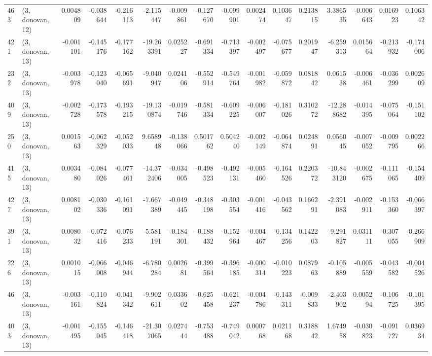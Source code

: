\begin{tabular}{llrrrrrrrrrrrrrr}
463 &  (3, donovan, 12) &   0.004809 & -0.038644 & -0.216113 &   -2.115447 & -0.009861 &  -0.127670 & -0.099901 &  0.002474 &  0.103647 &  0.213815 &     3.386535 & -0.006643 &  0.016923 &  0.106342 \\
421 &  (3, donovan, 13) &  -0.001101 & -0.145176 & -0.177162 &  -19.263391 &  0.025227 &  -0.691334 & -0.713397 & -0.002497 & -0.075677 &  0.201947 &    -6.259313 &  0.015664 & -0.213932 & -0.174006 \\
232 &  (3, donovan, 13) &  -0.003978 & -0.123040 & -0.065691 &   -9.040947 &  0.024106 &  -0.552914 & -0.549764 & -0.001982 & -0.059872 &  0.081842 &     0.061538 & -0.006461 & -0.036299 &  0.002609 \\
409 &  (3, donovan, 13) &  -0.002728 & -0.173578 & -0.193215 &  -19.130874 & -0.019746 &  -0.581334 & -0.609225 & -0.006007 & -0.181026 &  0.310272 &   -12.288682 & -0.014395 & -0.075064 & -0.151102 \\
250 &  (3, donovan, 13) &   0.001563 & -0.062329 & -0.052033 &    9.658948 & -0.138066 &   0.501762 &  0.504240 & -0.002149 & -0.064874 &  0.024891 &     0.056045 & -0.007052 & -0.009795 &  0.002266 \\
415 &  (3, donovan, 13) &   0.003480 & -0.084026 & -0.077461 &  -14.372406 & -0.034005 &  -0.498523 & -0.492131 & -0.005460 & -0.164526 &  0.220372 &   -10.843120 & -0.002675 & -0.111065 & -0.154409 \\
427 &  (3, donovan, 13) &   0.008102 & -0.030336 & -0.161091 &   -7.667389 & -0.049445 &  -0.348198 & -0.303554 & -0.001416 & -0.043562 &  0.166291 &    -2.391083 & -0.002911 & -0.153360 & -0.066397 \\
391 &  (3, donovan, 13) &   0.008032 & -0.072416 & -0.076233 &   -5.581191 & -0.184301 &  -0.188432 & -0.152964 & -0.004467 & -0.134256 &  0.142203 &    -9.291827 &  0.031111 & -0.307055 & -0.266909 \\
226 &  (3, donovan, 13) &   0.001015 & -0.066008 & -0.046944 &   -6.780284 &  0.002681 &  -0.399564 & -0.396185 & -0.000314 & -0.010223 &  0.087963 &    -0.105889 & -0.005559 & -0.043582 & -0.004526 \\
46  &  (3, donovan, 13) &  -0.003161 & -0.110824 & -0.041342 &   -9.902611 &  0.033602 &  -0.625458 & -0.621237 & -0.004786 & -0.143311 & -0.009833 &    -2.403902 &  0.005294 & -0.106725 & -0.101395 \\
403 &  (3, donovan, 13) &  -0.001495 & -0.155045 & -0.146418 &  -21.307065 &  0.027444 &  -0.753488 & -0.749042 &  0.000768 &  0.021168 &  0.318842 &     1.674958 & -0.030823 & -0.091727 &  0.036934 \\

\end{tabular}
